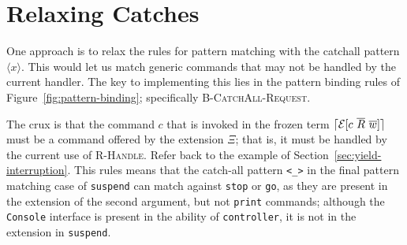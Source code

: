 \documentclass[msc,deptreport,cs]{infthesis} %
\newcommand{\code}[1]{\lstinline{#1}}
\DeclarePairedDelimiter{\ceil}{\lceil}{\rceil}
\newcommand{\many}{\overline}
\newcommand{\adj}{\Delta}
\newcommand{\adapt}{\Theta}
\newcommand{\ext}{\Xi}
\newcommand{\sig}{I}
\newcommand{\effin}[1]{\langle {#1} \rangle}
\newcommand{\EC}{\mathcal{E}}
\newcommand{\freeze}{\ceil}
\newcommand{\pipe}{\texttt{|}}
\begin{document}

\section{Relaxing Catches}
\label{sec:relaxing-catches}

One approach is to relax the rules for pattern matching with the catchall
pattern $\effin{x}$. This would let us match generic commands that may not be
handled by the current handler. The key to implementing this lies in the pattern
binding rules of Figure~\ref{fig:pattern-binding}; specifically
\textsc{B-CatchAll-Request}.

%

The crux is that the command $c$ that is invoked in the frozen term
$\freeze{\EC[c~\many{R}~\many{w}]}$ must be a command offered by the extension
$\ext$; that is, it must be handled by the current use of \textsc{R-Handle}.
Refer back to the example of Section~\ref{sec:yield-interruption}. This rules
means that the catch-all pattern \code{<_>} in the final pattern matching case
of \code{suspend} can match against \code{stop} or \code{go}, as they are
present in the extension of the second argument, but not \code{print} commands;
although the \code{Console} interface is present in the ability of
\code{controller}, it is not in the extension in \code{suspend}.
\end{document}
